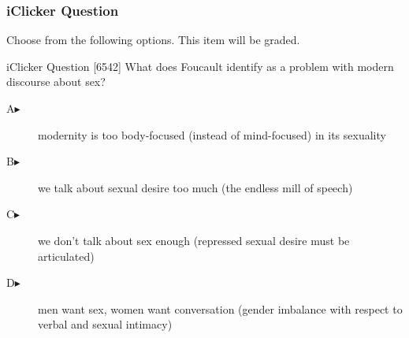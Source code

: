 \begin{frame}
  \frametitle{iClicker Question}
Choose from the following options. This item will be graded.
\begin{block}{iClicker Question}
[6542] What does Foucault identify as a problem with modern discourse about sex?
\end{block}
\begin{description}
\item[A\hspace{.2in}$\blacktriangleright$] modernity is too
  body-focused (instead of mind-focused) in its sexuality
\item[B\hspace{.2in}$\blacktriangleright$] we talk about sexual desire too much
  (the endless mill of speech)
\item[C\hspace{.2in}$\blacktriangleright$] we don't talk about sex
  enough (repressed sexual desire must be articulated)
\item[D\hspace{.2in}$\blacktriangleright$] men want sex, women want
  conversation (gender imbalance with respect to verbal and sexual
  intimacy)
\end{description}
\end{frame}
